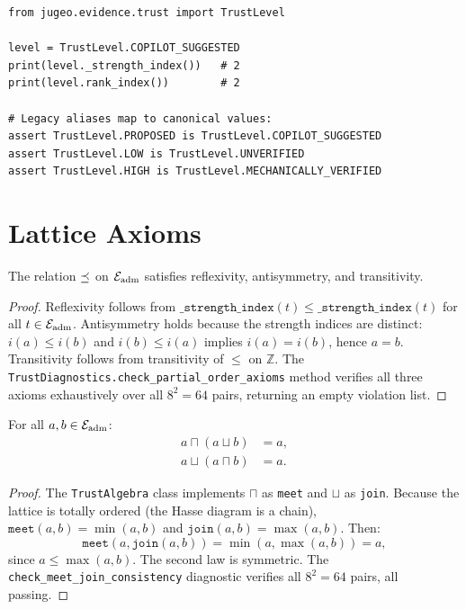 \documentclass[11pt]{article}
\begin{document}
\begin{lstlisting}[style=jugeo-python]
from jugeo.evidence.trust import TrustLevel

level = TrustLevel.COPILOT_SUGGESTED
print(level._strength_index())   # 2
print(level.rank_index())        # 2

# Legacy aliases map to canonical values:
assert TrustLevel.PROPOSED is TrustLevel.COPILOT_SUGGESTED
assert TrustLevel.LOW is TrustLevel.UNVERIFIED
assert TrustLevel.HIGH is TrustLevel.MECHANICALLY_VERIFIED
\end{lstlisting}

\section{Lattice Axioms}\label{sec:axioms}

\begin{theorem}\label{thm:partial-order}
The relation $\preceq$ on $\mathcal{E}_{\mathrm{adm}}$ satisfies reflexivity, antisymmetry, and
transitivity.
\end{theorem}

\begin{proof}
Reflexivity follows from $\texttt{\_strength\_index}(t) \leq
\texttt{\_strength\_index}(t)$ for all $t \in \mathcal{E}_{\mathrm{adm}}$.  Antisymmetry holds
because the strength indices are distinct: $i(a) \leq i(b)$ and $i(b) \leq
i(a)$ implies $i(a) = i(b)$, hence $a = b$.  Transitivity follows from
transitivity of $\leq$ on $\mathbb{Z}$.  The \texttt{TrustDiagnostics.check\_partial\_order\_axioms} method verifies all three axioms exhaustively over all $8^2 = 64$ pairs, returning an empty violation list.
\end{proof}

\begin{theorem}\label{thm:absorption}
For all $a, b \in \mathcal{E}_{\mathrm{adm}}$:
\begin{align}
  a \sqcap (a \sqcup b) &= a, \\
  a \sqcup (a \sqcap b) &= a.
\end{align}
\end{theorem}

\begin{proof}
The \texttt{TrustAlgebra} class implements $\sqcap$ as \texttt{meet} and
$\sqcup$ as \texttt{join}.  Because the lattice is totally ordered (the Hasse
diagram is a chain), $\texttt{meet}(a, b) = \min(a, b)$ and
$\texttt{join}(a, b) = \max(a, b)$.  Then:
\[
  \texttt{meet}(a, \texttt{join}(a, b)) = \min(a, \max(a, b)) = a,
\]
since $a \leq \max(a, b)$.  The second law is symmetric.  The
\texttt{check\_meet\_join\_consistency} diagnostic verifies all
$8^2 = 64$ pairs, all passing.
\end{proof}
\end{document}
